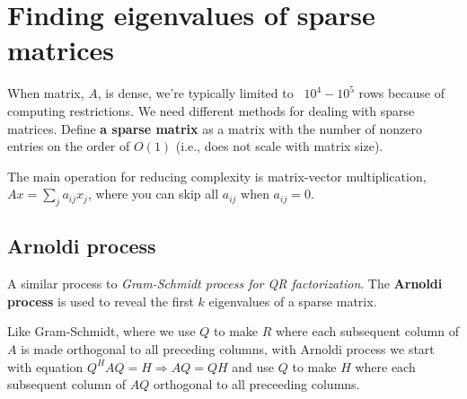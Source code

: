 \documentclass{article}
\begin{document}
\section{Finding eigenvalues of sparse matrices}
When matrix, $A$, is dense, we're typically limited to ~$10^4 - 10^5$ rows because of computing restrictions. We need different methods for dealing with sparse matrices. Define \textbf{a sparse matrix} as a matrix with the number of nonzero entries on the order of $O(1)$ (i.e., does not scale with matrix size).

The main operation for reducing complexity is matrix-vector multiplication, $Ax = \sum_j a_{ij}x_j$, where you can skip all $a_{ij}$ when $a_{ij} = 0$. 

\subsection{Arnoldi process}
A similar process to \textit{Gram-Schmidt process for QR factorization}. The \textbf{Arnoldi process} is used to reveal the first $k$ eigenvalues of a sparse matrix. 

Like Gram-Schmidt, where we use $Q$ to make $R$ where each subsequent column of $A$ is made orthogonal to all preceding columns, with Arnoldi process we start with equation $Q^HAQ = H \Longrightarrow AQ = QH$ and use $Q$ to make $H$ where each subsequent column of $AQ$ orthogonal to all preceeding columns. 
\end{document}
